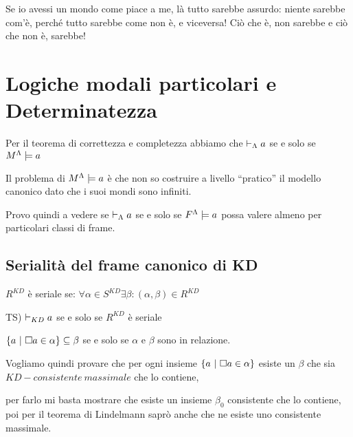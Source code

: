 \begin{savequote}[60mm]
Se io avessi un mondo come piace a me, là tutto sarebbe assurdo: niente sarebbe com'è, perché tutto sarebbe come non è, e viceversa! Ciò che è, non sarebbe e ciò che non è, sarebbe! 
 \end{savequote}


\chapter{Logiche modali particolari e Determinatezza}

Per il teorema di correttezza e completezza abbiamo che $\vdash_{\Lambda}a$
se e solo se $M^{\Lambda}\models a$

Il problema di $M^{\Lambda}\models a$ è che non so costruire a livello
``pratico'' il modello canonico dato che i suoi mondi sono infiniti.

Provo quindi a vedere se $\vdash_{\Lambda}a$ se e solo se $F^{\Lambda}\models a$
possa valere almeno per particolari classi di frame.\\




\section{Serialità del frame canonico di KD}

$R^{KD}$ è seriale se: $\forall\alpha\in S^{KD}\exists\beta:(\alpha,\beta)\in R^{KD}$

TS) $\vdash_{KD}a$ se e solo se $R^{KD}$ è seriale

$\{a\ |\ \square a\in\alpha\}\subseteq\beta$ se e solo se $\alpha$ e $\beta$ sono
in relazione.

Vogliamo quindi provare che per ogni insieme $\{a\ |\ \square a\in\alpha\}$
esiste un $\beta$ che sia $KD-consistente\ massimale$ che lo contiene,

per farlo mi basta mostrare che esiste un insieme $\beta_{0}$ consistente
che lo contiene, poi per il teorema di Lindelmann saprò anche che
ne esiste uno consistente massimale.\\


